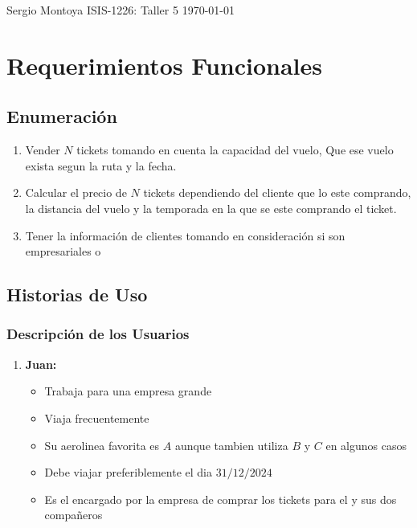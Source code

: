 \documentclass[12pt]{article}
\begin{document}

\noindent Sergio Montoya \hfill {\Large ISIS-1226: Taller 5} \hfill \today

\section*{Requerimientos Funcionales}
\subsection*{Enumeración}
  \begin{enumerate}
    \item Vender $N$ tickets tomando en cuenta la capacidad del vuelo, Que ese vuelo exista segun la ruta y la fecha.
    \item Calcular el precio de $N$ tickets dependiendo del cliente que lo este comprando, la distancia del vuelo y la temporada en la que se este comprando el ticket.
    \item Tener la información de clientes tomando en consideración si son empresariales o 
  \end{enumerate}

\subsection*{Historias de Uso}
\subsubsection*{Descripción de los Usuarios}
\begin{enumerate}
  \item \textbf{Juan:}
  \begin{itemize}
    \item Trabaja para una empresa grande
    \item Viaja frecuentemente
    \item Su aerolinea favorita es $A$ aunque tambien utiliza $B$ y $C$ en algunos casos
    \item Debe viajar preferiblemente el dia $31/12/2024$
    \item Es el encargado por la empresa de comprar los tickets para el y sus dos compañeros
  \end{itemize}
\end{enumerate}
\end{document}
